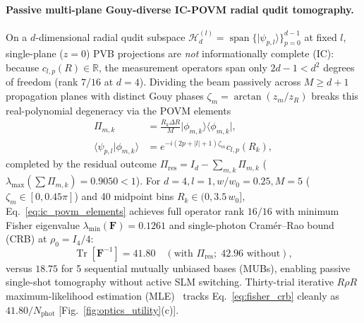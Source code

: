 \documentclass[aps,pra,reprint,amsmath,amssymb,floatfix,longbibliography]{revtex4-2}
\providecommand{\bra}[1]{\langle#1\rvert}
\providecommand{\ket}[1]{\lvert#1\rangle}
\providecommand{\braket}[2]{\langle#1\vert#2\rangle}
\providecommand{\abs}[1]{\lvert#1\rvert}
\begin{document}
\paragraph*{Passive multi-plane Gouy-diverse IC-POVM radial qudit tomography.}
On a $d$-dimensional radial qudit subspace $\mathcal{H}_d^{(l)} = \operatorname{span}\{\ket{\psi_{p,l}}\}_{p=0}^{d-1}$ at fixed $l$, single-plane ($z=0$) PVB projections are \emph{not} informationally complete (IC): because $c_{l,p}(R) \in \mathbb{R}$, the measurement operators span only $2d-1 < d^2$ degrees of freedom (rank $7/16$ at $d=4$). Dividing the beam passively across $M \ge d+1$ propagation planes with distinct Gouy phases $\zeta_m = \arctan(z_m/z_R)$ breaks this real-polynomial degeneracy via the POVM elements~\cite{Renes2004}
\begin{align}
\Pi_{m,k} &= \frac{R_k \Delta R}{M}\ket{\phi_{m,k}}\bra{\phi_{m,k}}, \nonumber \\
\braket{\psi_{p,l}}{\phi_{m,k}} &= e^{-i(2p+\abs{l}+1)\zeta_m} c_{l,p}(R_k),
\label{eq:ic_povm_elements}
\end{align}
completed by the residual outcome $\Pi_{\mathrm{res}} = I_d - \sum_{m,k}\Pi_{m,k}$ ($\lambda_{\max}(\sum \Pi_{m,k}) = 0.9050 < 1$). For $d=4, l=1, w/w_0=0.25, M=5$ ($\zeta_m \in [0,0.45\pi]$) and 40 midpoint bins $R_k \in (0, 3.5\,w_0]$, Eq.~\eqref{eq:ic_povm_elements} achieves full operator rank $16/16$ with minimum Fisher eigenvalue $\lambda_{\min}(\mathbf{F}) = 0.1261$ and single-photon Cram\'er--Rao bound (CRB) at $\rho_0 = I_4/4$:
\begin{equation}
\operatorname{Tr}\!\left[\mathbf{F}^{-1}\right] = 41.80 \quad (\text{with }\Pi_{\mathrm{res}};\; 42.96\text{ without}),
\label{eq:fisher_crb}
\end{equation}
versus $18.75$ for 5 sequential mutually unbiased bases (MUBs), enabling passive single-shot tomography without active SLM switching. Thirty-trial iterative $R\rho R$ maximum-likelihood estimation (MLE)~\cite{Lvovsky2004} tracks Eq.~\eqref{eq:fisher_crb} cleanly as $41.80/N_{\mathrm{phot}}$ [Fig.~\ref{fig:optics_utility}(c)].
\end{document}
